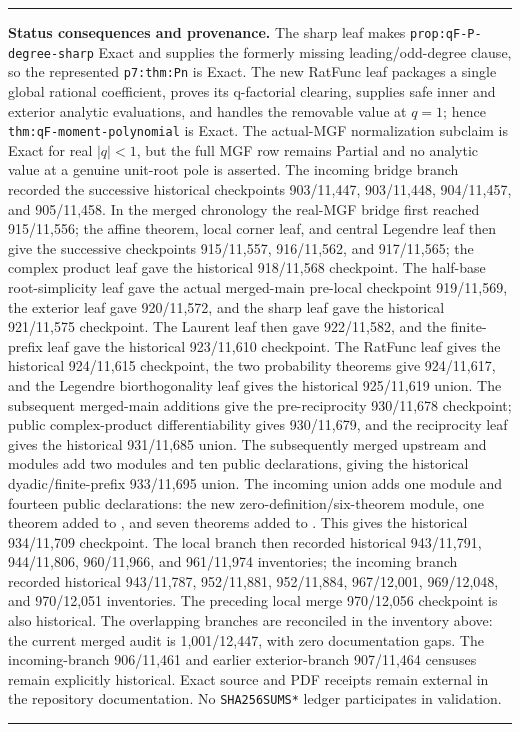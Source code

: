 \documentclass[11pt,oneside]{article}
\theoremstyle{definition}
\theoremstyle{remark}
\newenvironment{boxedremark}{%
  \par\smallskip\noindent\begin{center}\begin{minipage}{0.94\textwidth}%
  \color{black}\hrule\vspace{0.6em}\small
}{%
  \vspace{0.6em}\hrule\end{minipage}\end{center}\smallskip
}
\begin{document}
\begin{boxedremark}
\textbf{Status consequences and provenance.}
The sharp
leaf makes \nolinkurl{prop:qF-P-degree-sharp} Exact and supplies the formerly
missing leading/odd-degree clause, so the represented
\nolinkurl{p7:thm:Pn} is Exact.  The new RatFunc leaf packages a single global
rational coefficient, proves its q-factorial clearing, supplies safe inner and
exterior analytic evaluations, and handles the removable value at \(q=1\);
hence \nolinkurl{thm:qF-moment-polynomial} is Exact.  The actual-MGF
normalization subclaim is Exact for real \(\lvert q\rvert<1\), but the full MGF
row remains Partial and no analytic value at a genuine unit-root pole is
asserted.  The incoming bridge branch recorded the
successive historical checkpoints 903/11,447,
903/11,448, 904/11,457, and 905/11,458.  In the merged chronology the
real-MGF bridge first reached
915/11,556; the affine theorem, local corner leaf, and central Legendre leaf
then give the successive checkpoints 915/11,557, 916/11,562, and 917/11,565;
the complex product leaf gave the historical 918/11,568 checkpoint.  The
half-base root-simplicity leaf gave the actual merged-main pre-local checkpoint
919/11,569, the exterior leaf gave 920/11,572, and the sharp leaf gave the
historical 921/11,575 checkpoint.  The Laurent leaf then gave 922/11,582, and
the finite-prefix leaf gave the historical 923/11,610 checkpoint.  The RatFunc
leaf gives the historical 924/11,615 checkpoint, the two probability theorems
give 924/11,617, and the Legendre biorthogonality leaf gives the historical
925/11,619 union.  The subsequent merged-main additions give the
pre-reciprocity 930/11,678 checkpoint; public complex-product
differentiability gives 930/11,679, and the reciprocity leaf gives the
historical 931/11,685 union.  The subsequently merged upstream
 and
 modules add two modules and ten
public declarations, giving the historical dyadic/finite-prefix 933/11,695
union.  The incoming union adds one module and fourteen public declarations:
the new zero-definition/six-theorem  module,
one theorem added to , and seven theorems
added to .  This gives the historical
934/11,709 checkpoint.  The local branch then recorded historical
943/11,791, 944/11,806, 960/11,966, and 961/11,974 inventories; the incoming
branch recorded historical 943/11,787, 952/11,881, 952/11,884, 967/12,001,
969/12,048, and 970/12,051 inventories.  The preceding local merge
970/12,056 checkpoint is also historical.
The overlapping branches are reconciled in the inventory above: the current
merged audit is 1,001/12,447, with zero documentation gaps.
The incoming-branch
906/11,461 and earlier exterior-branch 907/11,464 censuses remain explicitly
historical.
Exact source and PDF receipts remain external in the repository documentation.
No \nolinkurl{SHA256SUMS*} ledger participates in validation.
\end{boxedremark}
\end{document}
